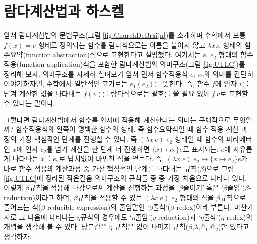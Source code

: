     
    

    \section{람다계산법과 하스켈}


    앞서 람다계산법의 문법구조(그림 \ref{fig:ChurchDeBruijn})를 소개하며
수학에서 보통 \(f(x)=e\) 형태로 정의되는 함수를 람다식으로는 이름을
붙이지 않고 \(\lambda x.e\) 형태의 함수요약(function abstraction)식으로
표현한다고 설명했다. 여기서는 \(e_1~e_2\) 형태의 함수적용(function
application)식을 포함한 람다계산법의 의미구조(그림 \ref{fig:UTLC})를
정리해 보자. 의미구조를 자세히 실펴보기 앞서 먼저 함수적용식
\(e_1~e_2\)의 의미를 간단히 이야기하자면, 수학에서 일반적인 표기로는
\(e_1(e_2)\)를 뜻한다. 즉, 함수 \(f\)에 인자 \(v\)를 넘겨 계산한 값을
나타내는 \(f(v)\)를 람다식으로는 괄호를 쓸 필요 없이 \(f~v\)로 표현할 수
있다는 말이다.

그렇다면 람다계산법에서 함수를 인자에 적용해 계산한다는 의미는
구체적으로 무엇일까? 함수적용식의 왼쪽이 명백한 함수의 형태, 즉
함수요약식일 때 함수 적용 계산 과정의 가장 핵심적인 단계를 진행할 수
있다. 즉 \((\lambda x. e)\;e_2\) 형태일 때 함수의 파라메터인 \(x\)에
인자 \(e_2\)를 넘겨 계산을 한 단계 더 진행하면 \(\{x{\mapsto}e_2\}e\)로
표시되는, \(e\)에 자유롭게 나타나는 \(x\)를 \(e_2\)로 납치없이 바꿔친
식을 얻는다. 즉,
\((\lambda x. e)\;e_2 \longmapsto \{x{\mapsto}e_2\}e\)가 바로 함수
적용의 계산과정 중 가장 핵심적인 단계를 나타내는 규칙(\(\beta\))으로
그림 \ref{fig:UTLC}에 정리된 작은걸음 의미구조의 규칙들 중 중 가장
처음으로 나타나 있다. 이렇게 \(\beta\)규칙을 적용해 나감으로써 계산을
진행하는 과정을 `\(\beta\)줄이기' 혹은
`\(\beta\)줄임'(\(\beta\)-reduction)이라고 하며, \(\beta\)규칙을 적용할
수 있는 \((\lambda x. e)\;e_2\) 형태의 식을 \(\beta\)규칙으로 줄어드는
식(\(\beta\)-reducible expression)의 줄임말인
`\(\beta\)줄식'(\(\beta\)-redex)이라 부른다. 마찬가지로 그 다음에
나타나는 \(\eta\)규칙의 경우에도 `\(\eta\)줄임'(\(\eta\)-reduction)과
`\(\eta\)줄식'(\(\eta\)-redex)의 개념을 생각해 볼 수 있다. 당분간은
\(\eta\) 규칙은 없이 나머지
규칙(\(\beta\),\(\lambda\),\(\textrm{@}_1\),\(\textrm{@}_2\))만 있다고
생각하자.

